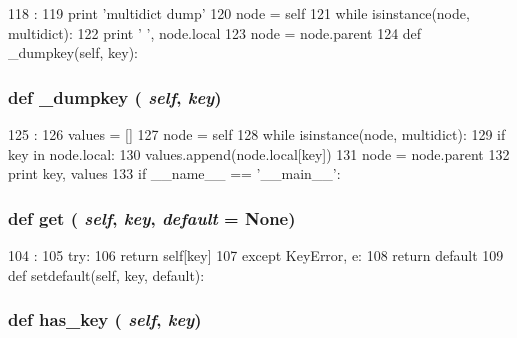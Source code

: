 \begin{DoxyCode}
118                    :
119         print 'multidict dump'
120         node = self
121         while isinstance(node, multidict):
122             print '    ', node.local
123             node = node.parent
124 
    def _dumpkey(self, key):
\end{DoxyCode}
\hypertarget{classm5_1_1util_1_1multidict_1_1multidict_aa0d8800b51944333e7825901498117f6}{
\subsubsection[{\_\-dumpkey}]{\setlength{\rightskip}{0pt plus 5cm}def \_\-dumpkey ( {\em self}, \/   {\em key})}}
\label{classm5_1_1util_1_1multidict_1_1multidict_aa0d8800b51944333e7825901498117f6}



\begin{DoxyCode}
125                            :
126         values = []
127         node = self
128         while isinstance(node, multidict):
129             if key in node.local:
130                 values.append(node.local[key])
131             node = node.parent
132         print key, values
133 
if __name__ == '__main__':
\end{DoxyCode}
\hypertarget{classm5_1_1util_1_1multidict_1_1multidict_a444a1328efb32d5d9d2dcb2efe855d3b}{
\subsubsection[{get}]{\setlength{\rightskip}{0pt plus 5cm}def get ( {\em self}, \/   {\em key}, \/   {\em default} = {\ttfamily None})}}
\label{classm5_1_1util_1_1multidict_1_1multidict_a444a1328efb32d5d9d2dcb2efe855d3b}



\begin{DoxyCode}
104                                     :
105         try:
106             return self[key]
107         except KeyError, e:
108             return default
109 
    def setdefault(self, key, default):
\end{DoxyCode}
\hypertarget{classm5_1_1util_1_1multidict_1_1multidict_a72fde7d0b9b935bbe0709da457c0a46e}{
\subsubsection[{has\_\-key}]{\setlength{\rightskip}{0pt plus 5cm}def has\_\-key ( {\em self}, \/   {\em key})}}
\label{classm5_1_1util_1_1multidict_1_1multidict_a72fde7d0b9b935bbe0709da457c0a46e}



